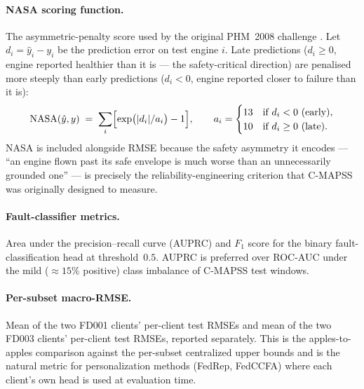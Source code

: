 \documentclass[preprint,12pt,authoryear]{elsarticle}
\begin{document}
\paragraph{NASA scoring function.}
The asymmetric-penalty score used by the original PHM~2008
challenge \citep{Saxena2008CMAPSS}. Let
$d_i = \hat{y}_i - y_i$ be the prediction error on test engine
$i$. Late predictions ($d_i \geq 0$, engine reported healthier than
it is --- the safety-critical direction) are penalised more
steeply than early predictions ($d_i < 0$, engine reported closer
to failure than it is):
\begin{equation}
    \mathrm{NASA}(\hat{y}, y)
    \;=\; \sum_{i} \Bigl[ \exp\bigl(|d_i| / a_i\bigr) - 1 \Bigr],
    \qquad
    a_i =
    \begin{cases}
        13 & \text{if } d_i < 0 \ (\text{early}), \\
        10 & \text{if } d_i \geq 0 \ (\text{late}).
    \end{cases}
    \label{eq:nasa}
\end{equation}
NASA is included alongside RMSE because the safety asymmetry it
encodes --- ``an engine flown past its safe envelope is much worse
than an unnecessarily grounded one'' --- is precisely the
reliability-engineering criterion that C-MAPSS was originally
designed to measure.

\paragraph{Fault-classifier metrics.}
Area under the precision--recall curve (AUPRC) and $F_1$ score for
the binary fault-classification head at threshold~$0.5$. AUPRC is
preferred over ROC-AUC under the mild ($\approx 15\%$ positive) class
imbalance of C-MAPSS test windows.

\paragraph{Per-subset macro-RMSE.}
Mean of the two FD001 clients' per-client test RMSEs and mean of
the two FD003 clients' per-client test RMSEs, reported separately.
This is the apples-to-apples comparison against the per-subset
centralized upper bounds and is the natural metric for
personalization methods (FedRep, FedCCFA) where each client's own
head is used at evaluation time.
\end{document}
